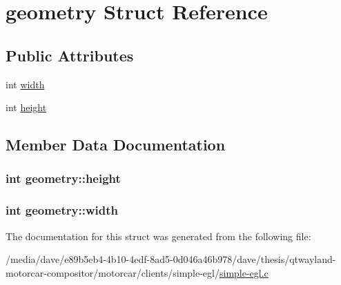 \hypertarget{structgeometry}{\section{geometry Struct Reference}
\label{structgeometry}
}
\subsection*{Public Attributes}
\begin{DoxyCompactItemize}
\item 
int \hyperlink{structgeometry_a854a87ce277335591f06958a2363c3e1}{width}
\item 
int \hyperlink{structgeometry_a6968ae18c72699d1c164399bf0e5cf14}{height}
\end{DoxyCompactItemize}


\subsection{Member Data Documentation}
\hypertarget{structgeometry_a6968ae18c72699d1c164399bf0e5cf14}{
\subsubsection[{height}]{\setlength{\rightskip}{0pt plus 5cm}int geometry\-::height}}\label{structgeometry_a6968ae18c72699d1c164399bf0e5cf14}
\hypertarget{structgeometry_a854a87ce277335591f06958a2363c3e1}{
\subsubsection[{width}]{\setlength{\rightskip}{0pt plus 5cm}int geometry\-::width}}\label{structgeometry_a854a87ce277335591f06958a2363c3e1}


The documentation for this struct was generated from the following file\-:\begin{DoxyCompactItemize}
\item 
/media/dave/e89b5eb4-\/4b10-\/4edf-\/8ad5-\/0d046a46b978/dave/thesis/qtwayland-\/motorcar-\/compositor/motorcar/clients/simple-\/egl/\hyperlink{simple-egl_8c}{simple-\/egl.\-c}\end{DoxyCompactItemize}
